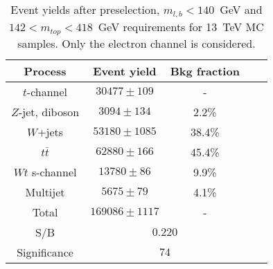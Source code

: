 \begin{table} [h]
\begin{center}
\begin{tabular}{|c|c|c|c|c|} 
 \hline
 Process & Event yield & Bkg fraction \\ \hline
 $t$-channel & $30477 \pm 109 $ & - \\ 
 $Z$-jet, diboson & $3094 \pm 134 $& 2.2\% \\ 
 $W$+jets & $53180 \pm  1085$ & 38.4\%\\
 $t\bar{t}$& $62880 \pm 166$ & 45.4\%\\
 $Wt$ s-channel & $13780 \pm 86$ & 9.9\% \\
 Multijet&$5675 \pm 79 $&4.1\%\\
 \hline
 Total & $169086 \pm 1117$ & - \\ \hline \hline
 S/B &\multicolumn{2}{|c|}{$0.220$} \\ \hline
 Significance &\multicolumn{2}{|c|}{$74$} \\ \hline
\end{tabular}
\caption{Event yields after preselection, $m_{l,b} < 140$~GeV and $142 <m_{top} < 418$~GeV requirements for 13~TeV MC samples. Only the electron channel is considered.}
\label{Table:mtopevents}
\end{center}
\end{table}


